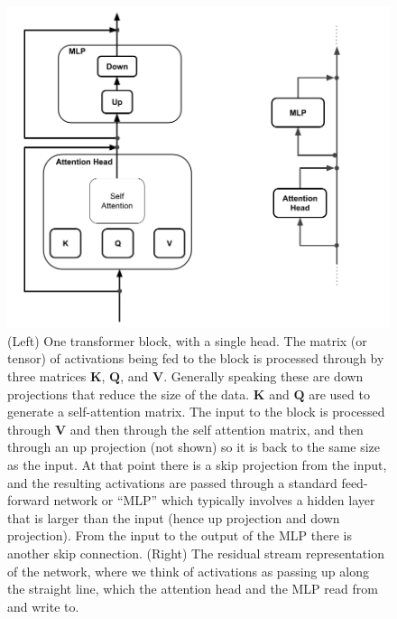 \begin{figure}[h]
\centering
\includegraphics[scale=.3]{./images/transformerBlockResidualStream.png}
\caption[Jeff Yoshimi with consultation from Tim Meyer.]{(Left) One transformer block, with a single head. The matrix  (or tensor) of activations being fed to the block is processed through by three matrices $\textbf{K}$, $\textbf{Q}$, and $\textbf{V}$.  Generally speaking these are down projections that reduce the size of the data.  $\textbf{K}$ and $\textbf{Q}$ are used to generate a self-attention matrix. The input to the block is processed through $\textbf{V}$ and then through the self attention matrix, and then through an up projection (not shown) so it is back to the same size as the input. At that point there is a skip projection from the input, and the resulting activations are passed through a standard feed-forward network or ``MLP'' which typically involves a hidden layer that is larger than the input (hence up projection and down projection). From the input to the output of the MLP there is another skip connection. (Right) The residual stream representation of the network, where we think of activations as passing up along the straight line, which the attention head and the MLP read from and write to. }
\label{transformerBlockSimple}
\end{figure}


